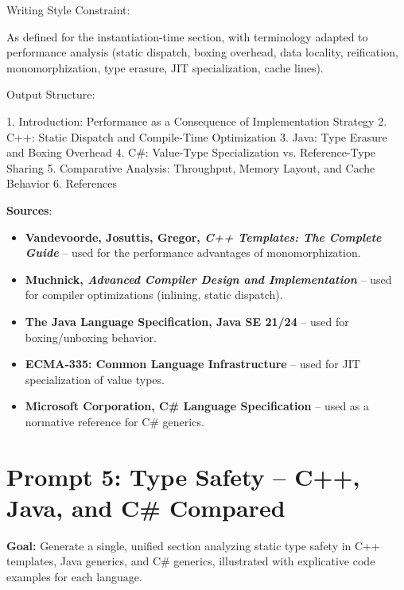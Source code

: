 \documentclass[11pt]{report}
\begin{document}
\begin{PromptVerbatim}
Writing Style Constraint:

As defined for the instantiation-time section, with terminology adapted
to performance analysis (static dispatch, boxing overhead, data locality,
reification, monomorphization, type erasure, JIT specialization, cache
lines).

Output Structure:

1. Introduction: Performance as a Consequence of Implementation Strategy
2. C++: Static Dispatch and Compile-Time Optimization
3. Java: Type Erasure and Boxing Overhead
4. C#: Value-Type Specialization vs. Reference-Type Sharing
5. Comparative Analysis: Throughput, Memory Layout, and Cache Behavior
6. References
\end{PromptVerbatim}

\vspace{0.5em}
\noindent\textbf{Sources}:
\begin{itemize}
    \item \textbf{Vandevoorde, Josuttis, Gregor, \emph{C++ Templates: The Complete Guide}} \cite{cpp_templates2017} -- used for the performance advantages of monomorphization.
    \item \textbf{Muchnick, \emph{Advanced Compiler Design and Implementation}} \cite{muchnick1997compiler} -- used for compiler optimizations (inlining, static dispatch).
    \item \textbf{The Java Language Specification, Java SE 21/24} \cite{jls2024} -- used for boxing/unboxing behavior.
    \item \textbf{ECMA-335: Common Language Infrastructure} \cite{ecma335_2024} -- used for JIT specialization of value types.
    \item \textbf{Microsoft Corporation, C\# Language Specification} \cite{CSharpSpec} -- used as a normative reference for C\# generics.
\end{itemize}

\section{Prompt 5: Type Safety -- C++, Java, and C\# Compared}
\label{Prompt 5 TypeSafety}

\noindent\textbf{Goal:} Generate a single, unified section analyzing static type safety in C++ templates, Java generics, and C\# generics, illustrated with explicative code examples for each language.
\end{document}
